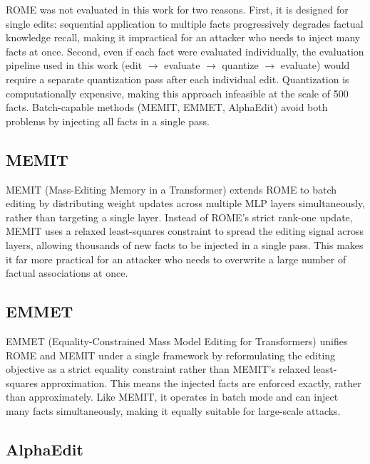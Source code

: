 \documentclass[conference]{IEEEtran}
\begin{document}
ROME was not evaluated in this work for two reasons. First, it is designed for single edits: sequential application to multiple facts progressively degrades factual knowledge recall, making it impractical for an attacker who needs to inject many facts at once. Second, even if each fact were evaluated individually, the evaluation pipeline used in this work (edit $\rightarrow$ evaluate $\rightarrow$ quantize $\rightarrow$ evaluate) would require a separate quantization pass after each individual edit. Quantization is computationally expensive, making this approach infeasible at the scale of 500 facts. Batch-capable methods (MEMIT, EMMET, AlphaEdit) avoid both problems by injecting all facts in a single pass.

\subsection{MEMIT}

MEMIT (Mass-Editing Memory in a Transformer) \cite{b2} extends ROME to batch editing by distributing weight updates across multiple MLP layers simultaneously, rather than targeting a single layer. Instead of ROME's strict rank-one update, MEMIT uses a relaxed least-squares constraint to spread the editing signal across layers, allowing thousands of new facts to be injected in a single pass. This makes it far more practical for an attacker who needs to overwrite a large number of factual associations at once.

\subsection{EMMET}

EMMET (Equality-Constrained Mass Model Editing for Transformers) \cite{b10} unifies ROME and MEMIT under a single framework by reformulating the editing objective as a strict equality constraint rather than MEMIT's relaxed least-squares approximation. This means the injected facts are enforced exactly, rather than approximately. Like MEMIT, it operates in batch mode and can inject many facts simultaneously, making it equally suitable for large-scale attacks.

\subsection{AlphaEdit}
\end{document}
